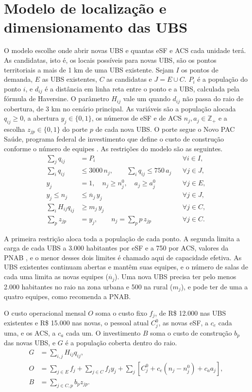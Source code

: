\documentclass[12pt,a4paper,oneside]{report}
\begin{document}
\section{Modelo de localização e dimensionamento das UBS}\label{sec:modeloaps}
O modelo escolhe onde abrir novas UBS e quantas eSF e ACS cada unidade terá. As candidatas, isto é, os
locais possíveis para novas UBS, são os pontos territoriais a mais de 1 km de uma UBS existente. Sejam
$I$ os pontos de demanda, $E$ as UBS existentes, $C$ as candidatas e $J=E\cup C$. $P_i$ é a população do
ponto $i$, e $d_{ij}$ é a distância em linha reta entre o ponto e a UBS, calculada pela fórmula de
Haversine. O parâmetro $H_{ij}$ vale um quando $d_{ij}$ não passa do raio de cobertura, de 3 km no
cenário principal. As variáveis são a população alocada $q_{ij}\geq0$, a abertura $y_j\in\{0,1\}$, os números de eSF e de
ACS $n_j,a_j\in\mathbb{Z}_+$ e a escolha $z_{jp}\in\{0,1\}$ do porte $p$ de cada nova UBS. O porte segue
o Novo PAC Saúde, programa federal de investimento que define o custo de construção conforme o número
de equipes \citep{novopac2025}. As restrições do modelo são as seguintes.
\begin{align}
\sum_j q_{ij}&=P_i &&\forall i\in I,\\
\sum_i q_{ij}&\leq3000\,n_j,\qquad \sum_i q_{ij}\leq750\,a_j &&\forall j\in J,\\
y_j&=1,\quad n_j\geq n_j^0,\quad a_j\geq a_j^0 &&\forall j\in E,\\
y_j\leq n_j&\leq\overline n_j\, y_j &&\forall j\in J,\\
\sum_i H_{ij}q_{ij}&\geq m_j\,y_j &&\forall j\in C,\\
\sum_p z_{jp}&=y_j,\qquad n_j=\sum_p p\,z_{jp} &&\forall j\in C.
\end{align}

A primeira restrição aloca toda a população de cada ponto. A segunda limita a carga de cada UBS a 3.000
habitantes por eSF e a 750 por ACS, valores da PNAB \citep{pnab2017}, e o menor desses dois limites é
chamado aqui de capacidade efetiva. As UBS existentes continuam abertas e mantêm suas equipes, e o
número de salas de cada uma limita as novas equipes ($\overline n_j$). Uma nova UBS precisa ter pelo menos
2.000 habitantes no raio na zona urbana e 500 na rural ($m_j$), e pode ter de uma a quatro equipes, como
recomenda a PNAB.

O custo operacional mensal $O$ soma o custo fixo $f_j$, de R\$ 12.000 nas UBS existentes e R\$ 15.000
nas novas, o pessoal atual $C_j^0$, as novas eSF, a $c_e$ cada uma, e os ACS, a $c_a$ cada um. O
investimento $B$ soma o custo de construção $b_p$ das novas UBS, e $G$ é a população coberta dentro do
raio.
\begin{align}
G&=\sum_{i,j}H_{ij}q_{ij},\\
O&=\sum_{j\in E}f_j+\sum_{j\in C}f_jy_j+
\sum_j\left[C_j^0+c_e(n_j-n_j^0)+c_aa_j\right],\\
B&=\sum_{j\in C,p}b_pz_{jp}.
\end{align}
\end{document}
